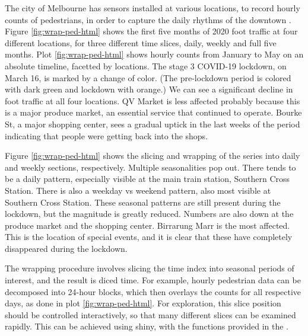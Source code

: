 The city of Melbourne has sensors installed at various locations, to
record hourly counts of pedestrians, in order to capture the daily
rhythms of the downtown \citep{ped}. Figure \ref{fig:wrap-ped-html}
shows the first five months of 2020 foot traffic at four different
locations, for three different time slices, daily, weekly and full five
months. Plot \ref{fig:wrap-ped-html} shows hourly counts from January to
May on an absolute timeline, facetted by locations. The stage 3 COVID-19
lockdown, on March 16, is marked by a change of color. (The pre-lockdown
period is colored with dark green and lockdown with orange.) We can see
a significant decline in foot traffic at all four locations. QV Market
is less affected probably because this is a major produce market, an
essential service that continued to operate. Bourke St, a major shopping
center, sees a gradual uptick in the last weeks of the period indicating
that people were getting back into the shops.

Figure \ref{fig:wrap-ped-html} shows the slicing and wrapping of the
series into daily and weekly sections, respectively. Multiple
seasonalities pop out. There tends to be a daily pattern, especially
visible at the main train station, Southern Cross Station. There is also
a weekday vs weekend pattern, also most visible at Southern Cross
Station. These seasonal patterns are still present during the lockdown,
but the magnitude is greatly reduced. Numbers are also down at the
produce market and the shopping center. Birrarung Marr is the most
affected. This is the location of special events, and it is clear that
these have completely disappeared during the lockdown.

The wrapping procedure involves slicing the time index into seasonal
periods of interest, and the result is diced time. For example, hourly
pedestrian data can be decomposed into 24-hour blocks, which then
overlays the counts for all respective days, as done in plot
\ref{fig:wrap-ped-html}. For exploration, this slice position should be
controlled interactively, so that many different slices can be examined
rapidly. This can be achieved using shiny, with the functions provided
in the .

